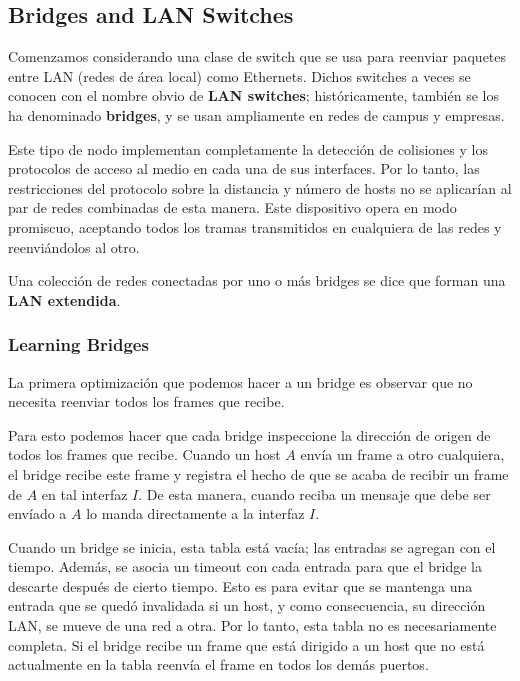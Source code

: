 \subsection{Bridges and LAN Switches}
Comenzamos considerando una clase de switch que se usa para reenviar paquetes entre LAN (redes de área local) como Ethernets. Dichos switches a veces se conocen con el nombre obvio de \textbf{LAN switches}; históricamente, también se los ha denominado \textbf{bridges}, y se usan ampliamente en redes de campus y empresas.

Este tipo de nodo implementan completamente la detección de colisiones y los protocolos de acceso al medio en cada una de sus interfaces. Por lo tanto, las restricciones del protocolo sobre la distancia y número de hosts no se aplicarían al par de redes combinadas de esta manera. Este dispositivo opera en modo promiscuo, aceptando todos los tramas transmitidos en cualquiera de las redes y reenviándolos al otro.

Una colección de redes conectadas por uno o más bridges se dice que forman una \textbf{LAN extendida}.

\subsubsection{Learning Bridges}
La primera optimización que podemos hacer a un bridge es observar que no necesita reenviar todos los frames que recibe.

Para esto podemos hacer que cada bridge inspeccione la dirección de origen de todos los frames que recibe. Cuando un host \(A\) envía un frame a otro cualquiera, el bridge recibe este frame y registra el hecho de que se acaba de recibir un frame de \(A\) en tal interfaz \(I\). De esta manera, cuando reciba un mensaje que debe ser envíado a \(A\) lo manda directamente a la interfaz \(I\).

Cuando un bridge se inicia, esta tabla está vacía; las entradas se agregan con el tiempo. Además, se asocia un timeout con cada entrada para que el bridge la descarte después de cierto tiempo. Esto es para evitar que se mantenga una entrada que se quedó invalidada si un host, y como consecuencia, su dirección LAN, se mueve de una red a otra. Por lo tanto, esta tabla no es necesariamente completa. Si el bridge recibe un frame que está dirigido a un host que no está actualmente en la tabla reenvía el frame en todos los demás puertos.

